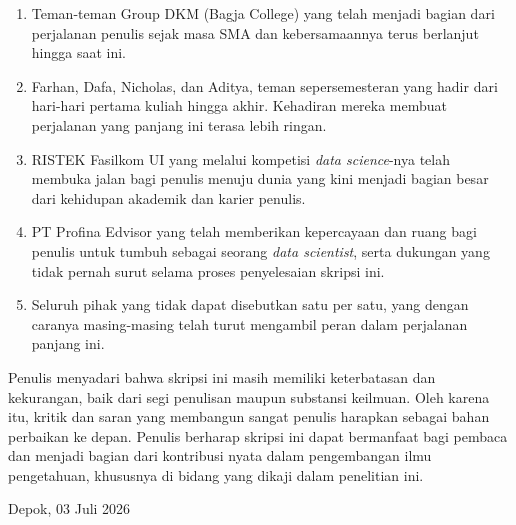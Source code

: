 \begin{enumerate}
    \item Teman-teman Group DKM (Bagja College) yang telah menjadi bagian 
        dari perjalanan penulis sejak masa SMA dan kebersamaannya terus 
        berlanjut hingga saat ini.
    \item Farhan, Dafa, Nicholas, dan Aditya, teman sepersemesteran yang 
        hadir dari hari-hari pertama kuliah hingga akhir. Kehadiran mereka 
        membuat perjalanan yang panjang ini terasa lebih ringan.
    \item RISTEK Fasilkom UI yang melalui kompetisi \textit{data science}-nya 
        telah membuka jalan bagi penulis menuju dunia yang kini menjadi 
        bagian besar dari kehidupan akademik dan karier penulis.
    \item PT Profina Edvisor yang telah memberikan kepercayaan dan ruang 
        bagi penulis untuk tumbuh sebagai seorang \textit{data scientist}, 
        serta dukungan yang tidak pernah surut selama proses penyelesaian 
        skripsi ini.
    \item Seluruh pihak yang tidak dapat disebutkan satu per satu, yang 
        dengan caranya masing-masing telah turut mengambil peran dalam 
        perjalanan panjang ini.
\end{enumerate}

Penulis menyadari bahwa skripsi ini masih memiliki keterbatasan dan 
kekurangan, baik dari segi penulisan maupun substansi keilmuan. 
Oleh karena itu, kritik dan saran yang membangun sangat penulis harapkan 
sebagai bahan perbaikan ke depan. 
Penulis berharap skripsi ini dapat bermanfaat bagi pembaca dan menjadi 
bagian dari kontribusi nyata dalam pengembangan ilmu pengetahuan, 
khususnya di bidang yang dikaji dalam penelitian ini.

\vspace*{0.5cm}
\noindent Depok, 03 Juli 2026\\[0.1cm]
\penulis
